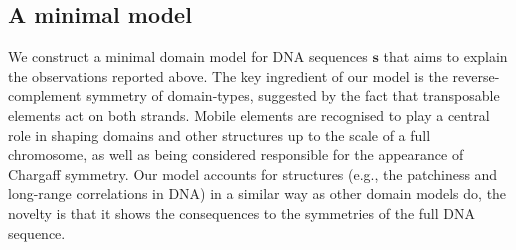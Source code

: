 \documentclass[fleqn,10pt]{wlscirep}
\begin{document}
\subsection*{A minimal model}

We construct  a minimal domain  model for DNA sequences $\textbf{s}$ that aims to explain the observations reported above. The key ingredient of our model is the reverse-complement symmetry of domain-types, suggested by the fact that transposable elements act on both strands.  Mobile elements are recognised to play a central role in shaping domains and other structures up to the scale of a full chromosome, as well as being considered responsible for the appearance of Chargaff symmetry\cite{B06}. Our model accounts for structures (e.g., the patchiness and long-range correlations in DNA) in a similar way as other domain models do, the novelty is that it shows the consequences to the symmetries of the full DNA sequence.
\end{document}
